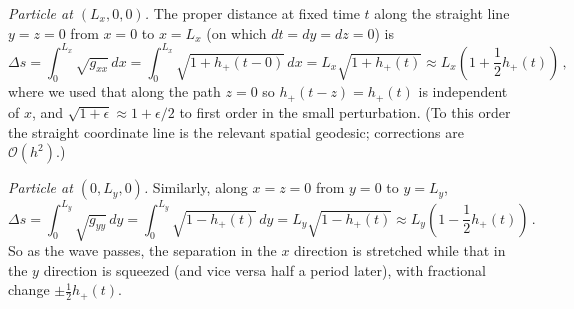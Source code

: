 \documentclass[12pt]{article}
\newcommand{\be}{\begin{equation}}
\newcommand{\ee}{\end{equation}}
\begin{document}
\begin{enumerate}[label=\alph*)]
\emph{Particle at $(L_x,0,0)$.} The proper distance at fixed time $t$ along the straight line $y=z=0$ from $x=0$ to $x=L_x$
(on which $dt=dy=dz=0$) is
\be
\Delta s = \int_0^{L_x}\sqrt{g_{xx}}\,dx = \int_0^{L_x}\sqrt{1 + h_+(t - 0)}\,dx = L_x\sqrt{1 + h_+(t)}
\approx L_x\left(1 + \frac12 h_+(t)\right)\,,
\ee
where we used that along the path $z=0$ so $h_+(t-z) = h_+(t)$ is independent of $x$, and $\sqrt{1+\epsilon}\approx 1+\epsilon/2$
to first order in the small perturbation. (To this order the straight coordinate line is the relevant spatial geodesic;
corrections are $\mathcal{O}(h^2)$.)

\emph{Particle at $(0,L_y,0)$.} Similarly, along $x=z=0$ from $y=0$ to $y=L_y$,
\be
\Delta s = \int_0^{L_y}\sqrt{g_{yy}}\,dy = \int_0^{L_y}\sqrt{1 - h_+(t)}\,dy = L_y\sqrt{1 - h_+(t)}
\approx L_y\left(1 - \frac12 h_+(t)\right)\,.
\ee
So as the wave passes, the separation in the $x$ direction is stretched while that in the $y$ direction is squeezed
(and vice versa half a period later), with fractional change $\pm\frac12 h_+(t)$.


\end{enumerate}
\end{document}
